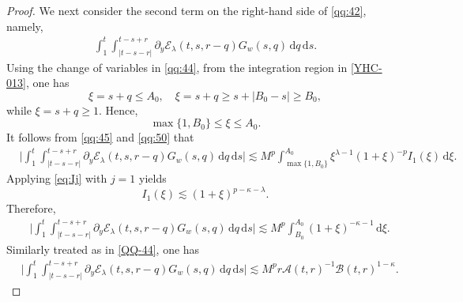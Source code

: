 \documentclass[10pt,a4paper]{amsart}
\newcommand{\Acal}{\mathcal A}
\newcommand{\Bcal}{\mathcal B}
\newcommand{\Ecal}{\mathcal E}
\newcommand{\dd}{\,\mathrm{d}}
\begin{document}
\begin{proof}
We next consider the second term on the right-hand side of
\eqref{qq:42}, namely,
\begin{equation}\label{YHC-013}
\begin{aligned}
\int_1^t
\int_{|t-s-r|}^{t-s+r}
\partial_y\Ecal_\lambda(t,s,r-q)
G_w(s,q)\dd q\dd s .
\end{aligned}
\end{equation}
Using the change of variables in \eqref{qq:44},  from the integration region in \eqref{YHC-013}, one has
\[
\xi=s+q\leq A_0,
\quad
\xi=s+q\geq s+|B_0-s|\geq B_0,
\]
while $\xi=s+q\geq1$. Hence,
\[
\max\{1,B_0\}\leq\xi\leq A_0.
\]
It follows from \eqref{qq:45} and \eqref{qq:50} that
\begin{equation}
\label{qq:62}
\begin{aligned}
&
\big|
\int_1^t
\int_{|t-s-r|}^{t-s+r}
\partial_y\Ecal_\lambda(t,s,r-q)
G_w(s,q)\dd q\dd s
\big|
\lesssim
M^p
\int_{\max\{1,B_0\}}^{A_0}
\xi^{\lambda-1}
(1+\xi)^{-p}
I_1(\xi)
\dd\xi .
\end{aligned}
\end{equation}
Applying \eqref{eq:Ij} with $j=1$ yields
\[
I_1(\xi)
\lesssim
(1+\xi)^{p-\kappa-\lambda}.
\]
Therefore,
\begin{equation}
\label{qq:63}
\begin{aligned}
&
\big|
\int_1^t
\int_{|t-s-r|}^{t-s+r}
\partial_y\Ecal_\lambda(t,s,r-q)
G_w(s,q)\dd q\dd s
\big|
\lesssim
M^p
\int_{B_0}^{A_0}
(1+\xi)^{-\kappa-1}
\dd\xi .
\end{aligned}
\end{equation}
Similarly treated as in \eqref{QQ-44}, one has
\begin{equation}
\label{qq:64}
\begin{aligned}
&
\big|
\int_1^t
\int_{|t-s-r|}^{t-s+r}
\partial_y\Ecal_\lambda(t,s,r-q)
G_w(s,q)\dd q\dd s
\big|
\lesssim
M^p
r\Acal(t,r)^{-1}
\Bcal(t,r)^{1-\kappa}.
\end{aligned}
\end{equation}


\end{proof}
\end{document}
